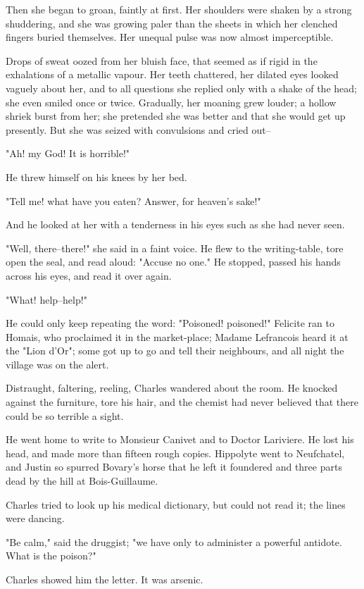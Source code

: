 \documentclass{tufte-book}
\begin{document}
Then she began to groan, faintly at first. Her shoulders were shaken by
a strong shuddering, and she was growing paler than the sheets in which
her clenched fingers buried themselves. Her unequal pulse was now almost
imperceptible.

Drops of sweat oozed from her bluish face, that seemed as if rigid in
the exhalations of a metallic vapour. Her teeth chattered, her dilated
eyes looked vaguely about her, and to all questions she replied only
with a shake of the head; she even smiled once or twice. Gradually, her
moaning grew louder; a hollow shriek burst from her; she pretended she
was better and that she would get up presently. But she was seized with
convulsions and cried out--

"Ah! my God! It is horrible!"

He threw himself on his knees by her bed.

"Tell me! what have you eaten? Answer, for heaven's sake!"

And he looked at her with a tenderness in his eyes such as she had never
seen.

"Well, there--there!" she said in a faint voice. He flew to the
writing-table, tore open the seal, and read aloud: "Accuse no one." He
stopped, passed his hands across his eyes, and read it over again.

"What! help--help!"

He could only keep repeating the word: "Poisoned! poisoned!" Felicite
ran to Homais, who proclaimed it in the market-place; Madame Lefrancois
heard it at the "Lion d'Or"; some got up to go and tell their
neighbours, and all night the village was on the alert.

Distraught, faltering, reeling, Charles wandered about the room. He
knocked against the furniture, tore his hair, and the chemist had never
believed that there could be so terrible a sight.

He went home to write to Monsieur Canivet and to Doctor Lariviere. He
lost his head, and made more than fifteen rough copies. Hippolyte went
to Neufchatel, and Justin so spurred Bovary's horse that he left it
foundered and three parts dead by the hill at Bois-Guillaume.

Charles tried to look up his medical dictionary, but could not read it;
the lines were dancing.

"Be calm," said the druggist; "we have only to administer a powerful
antidote. What is the poison?"

Charles showed him the letter. It was arsenic.
\end{document}
